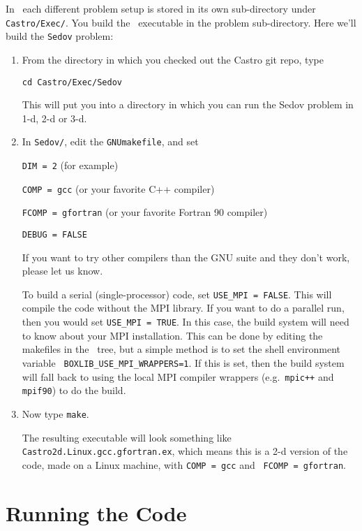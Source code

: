 In \castro\ each different problem setup is stored in its own
sub-directory under {\tt Castro/Exec/}.  You build the
\castro\ executable in the problem sub-directory.  Here we'll
build the {\tt Sedov} problem:

\begin{enumerate}

\item From the directory in which you checked out the Castro git repo,
  type
\begin{verbatim}
cd Castro/Exec/Sedov
\end{verbatim}
This will put you into a directory in which you can run the Sedov
problem in 1-d, 2-d or 3-d.

\item In {\tt Sedov/}, edit the {\tt GNUmakefile}, and set

{\tt DIM = 2} (for example)

{\tt COMP = gcc} (or your favorite C++ compiler)

{\tt FCOMP = gfortran} (or your favorite Fortran 90 compiler)

{\tt DEBUG = FALSE}

If you want to try other compilers than the GNU suite and they don't
work, please let us know.

To build a serial (single-processor) code, set {\tt USE\_MPI = FALSE}.
This will compile the code without the MPI library.  If you want to do
a parallel run, then you would set {\tt USE\_MPI = TRUE}.  In this
case, the build system will need to know about your MPI installation.
This can be done by editing the makefiles in the \boxlib\ tree, but a
simple method is to set the shell environment variable {\tt
  BOXLIB\_USE\_MPI\_WRAPPERS=1}.  If this is set, then the build
system will fall back to using the local MPI compiler wrappers
(e.g.\ {\tt mpic++} and {\tt mpif90}) to do the build.

\item Now type {\tt make}.

  The resulting executable will look something like {\tt
    Castro2d.Linux.gcc.gfortran.ex}, which means this is a 2-d version
  of the code, made on a Linux machine, with {\tt COMP = gcc} and {\tt
    FCOMP = gfortran}.

\end{enumerate}

\section{Running the Code}

